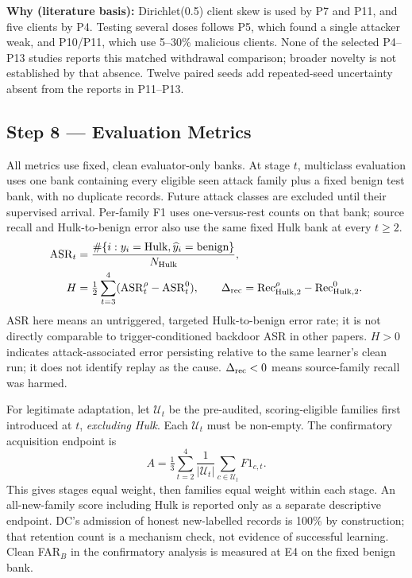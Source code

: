 \documentclass[10pt,a4paper]{article}
\newcommand{\why}[1]{\par\nopagebreak[4]\noindent\colorbox{black!5}{\parbox{\dimexpr\linewidth-2\fboxsep}{\small\textbf{Why (literature basis):} #1}}\par}
\begin{document}
\why{Dirichlet(0.5) client skew is used by P7 and P11, and five clients by P4. Testing several doses follows P5, which found a single attacker weak, and P10/P11, which use 5--30\% malicious clients. None of the selected P4--P13 studies reports this matched withdrawal comparison; broader novelty is not established by that absence. Twelve paired seeds add repeated-seed uncertainty absent from the reports in P11--P13.}

\subsection{Step 8 --- Evaluation Metrics}
All metrics use fixed, clean evaluator-only banks. At stage $t$, multiclass evaluation uses one bank containing every eligible seen attack family plus a fixed benign test bank, with no duplicate records. Future attack classes are excluded until their supervised arrival. Per-family F1 uses one-versus-rest counts on that bank; source recall and Hulk-to-benign error also use the same fixed Hulk bank at every $t\ge2$.
\begin{equation}
\begin{aligned}
\mathrm{ASR}_t&=\frac{\#\{i:y_i=\text{Hulk},\widehat y_i=\text{benign}\}}{N_{\rm Hulk}},\\
H&=\tfrac12\sum_{t=3}^{4}(\mathrm{ASR}^{\rho}_t-\mathrm{ASR}^{0}_t),\qquad
\Delta_{\rm rec}=\mathrm{Rec}^{\rho}_{{\rm Hulk},2}-\mathrm{Rec}^{0}_{{\rm Hulk},2}.
\end{aligned}
\label{eq:asr}
\end{equation}
ASR here means an untriggered, targeted Hulk-to-benign error rate; it is not directly comparable to trigger-conditioned backdoor ASR in other papers. $H>0$ indicates attack-associated error persisting relative to the same learner's clean run; it does not identify replay as the cause. $\Delta_{\rm rec}<0$ means source-family recall was harmed.

For legitimate adaptation, let $\mathcal U_t$ be the pre-audited, scoring-eligible families first introduced at $t$, \emph{excluding Hulk}. Each $\mathcal U_t$ must be non-empty. The confirmatory acquisition endpoint is
\begin{equation}
A=\tfrac13\sum_{t=2}^{4}\frac{1}{|\mathcal U_t|}\sum_{c\in\mathcal U_t}F1_{c,t}.
\label{eq:acquisition}
\end{equation}
This gives stages equal weight, then families equal weight within each stage. An all-new-family score including Hulk is reported only as a separate descriptive endpoint. DC's admission of honest new-labelled records is 100\% by construction; that retention count is a mechanism check, not evidence of successful learning. Clean FAR$_B$ in the confirmatory analysis is measured at E4 on the fixed benign bank.
\end{document}

